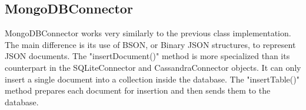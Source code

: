 \subsection{MongoDBConnector}




\par MongoDBConnector works very similarly to the previous class implementation. The main difference is its use of BSON, or Binary JSON structures, to represent JSON documents. The "insertDocument()" method is more specialized than its counterpart in the SQLiteConnector and CassandraConnector objects. It can only insert a single document into a collection inside the database. The "insertTable()" method prepares each document for insertion and then sends them to the database.